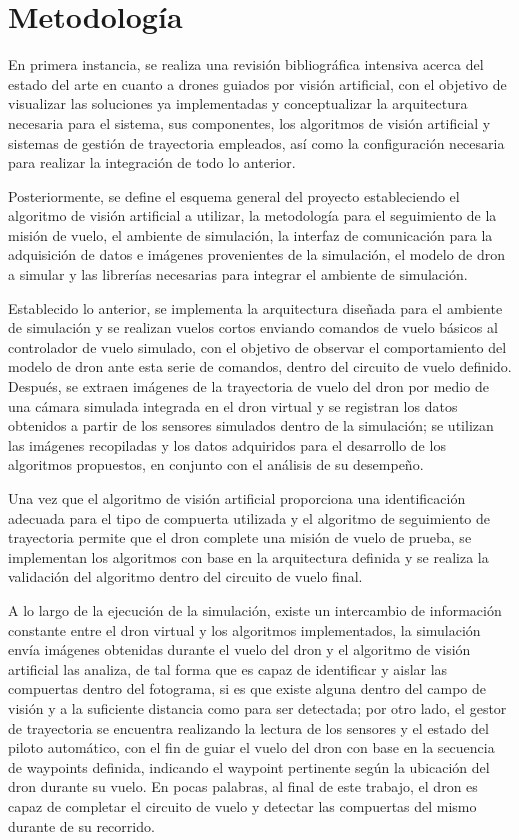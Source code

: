 \section{Metodología}

En primera instancia, se realiza una revisión bibliográfica intensiva acerca del estado del arte en cuanto a drones guiados por visión artificial, con el objetivo de visualizar las soluciones ya implementadas y conceptualizar la arquitectura necesaria para el sistema, sus componentes, los algoritmos de visión artificial y sistemas de gestión de trayectoria empleados, así como la configuración necesaria para realizar la integración de todo lo anterior.

Posteriormente, se define el esquema general del proyecto estableciendo el algoritmo de visión artificial a utilizar, la metodología para el seguimiento de la misión de vuelo, el ambiente de simulación, la interfaz de comunicación para la adquisición de datos e imágenes provenientes de la simulación, el modelo de dron a simular y las librerías necesarias para integrar el ambiente de simulación.

Establecido lo anterior, se implementa la arquitectura diseñada para el ambiente de simulación y se realizan vuelos cortos enviando comandos de vuelo básicos al controlador de vuelo simulado, con el objetivo de observar el comportamiento del modelo de dron ante esta serie de comandos, dentro del circuito de vuelo definido. Después, se extraen imágenes de la trayectoria de vuelo del dron por medio de una cámara simulada integrada en el dron virtual y se registran los datos obtenidos a partir de los sensores simulados dentro de la simulación; se utilizan las imágenes recopiladas y los datos adquiridos para el desarrollo de los algoritmos propuestos, en conjunto con el análisis de su desempeño.

Una vez que el algoritmo de visión artificial proporciona una identificación adecuada para el tipo de compuerta utilizada y el algoritmo de seguimiento de trayectoria permite que el dron complete una misión de vuelo de prueba, se implementan los algoritmos con base en la arquitectura definida y se realiza la validación del algoritmo dentro del circuito de vuelo final. 

A lo largo de la ejecución de la simulación, existe un intercambio de información constante entre el dron virtual y los algoritmos implementados, la simulación envía imágenes obtenidas durante el vuelo del dron y el algoritmo de visión artificial las analiza, de tal forma que es capaz de identificar y aislar las compuertas dentro del fotograma, si es que existe alguna dentro del campo de visión y a la suficiente distancia como para ser detectada; por otro lado, el gestor de trayectoria se encuentra realizando la lectura de los sensores y el estado del piloto automático, con el fin de guiar el vuelo del dron con base en la secuencia de waypoints definida, indicando el waypoint pertinente según la ubicación del dron durante su vuelo. En pocas palabras, al final de este trabajo, el dron es capaz de completar el circuito de vuelo y detectar las compuertas del mismo durante de su recorrido.

